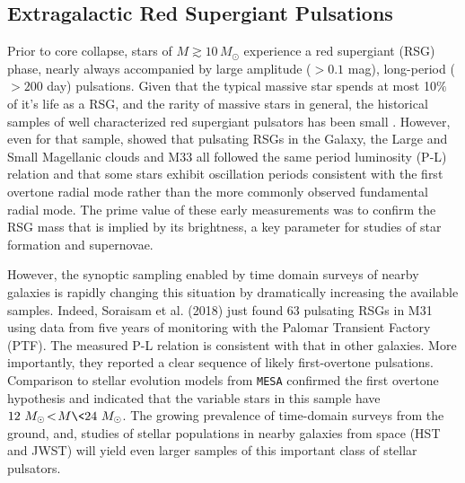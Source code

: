 {\color{green}
\subsection{Extragalactic Red Supergiant Pulsations}
}


Prior to core collapse, stars of $M \! \gtrsim \! 10 \, M_\odot$ experience a red
supergiant (RSG) phase, nearly always accompanied by large amplitude
($>0.1$ mag), long-period ($>200 $ day) pulsations.  Given that the
typical massive star spends at most 10$\%$ of it's life as a RSG, and
the rarity of massive stars in general, the historical samples of well
characterized red supergiant pulsators has been small \citep[see][for a nice compilation]{Yang_2012}. However, even for that sample, \citet{Yang_2012} showed that pulsating RSGs in the Galaxy, the Large and Small Magellanic clouds and M33 all followed the
same period luminosity (P-L) relation and that some stars exhibit
oscillation periods consistent with the first overtone radial mode
rather than the more commonly observed fundamental radial mode. The
prime value of these early measurements was to confirm the RSG mass
that is implied by its brightness, a key parameter for studies of star
formation and supernovae.

However, the synoptic sampling enabled by time domain surveys of
nearby galaxies is rapidly changing this situation by dramatically
increasing the available samples. Indeed, Soraisam et al. (2018) just
found 63 pulsating RSGs in M31 using data from five years of
monitoring with the Palomar Transient Factory (PTF). The measured P-L
relation is consistent with that in other galaxies. More importantly,
they reported a clear sequence of likely first-overtone
pulsations. Comparison to stellar evolution models from \texttt{MESA}
confirmed the first overtone hypothesis and indicated that the
variable stars in this sample have $12~M_{\odot} \! < \! M \<24~M_{\odot}$. The growing prevalence of 
time-domain surveys from the ground, and, studies 
of stellar populations in nearby galaxies from space (HST and JWST) 
will yield even larger samples of this important class of stellar pulsators. 